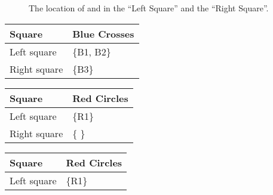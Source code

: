 \documentclass[a4paper,11pt,english]{sphinxmanual}
\begin{document}
\begin{figure}[htbp]
\centering
\capstart

\noindent{}
\caption{The location of  and  in the “Left Square” and the “Right Square”.}\label{\detokenize{background:id30}}\label{\detokenize{background:figuresquarepoint}}\end{figure}


\begin{savenotes}\sphinxattablestart
\centering
{}
\sphinxthecaptionisattop
{}\label{\detokenize{background:id31}}\label{\detokenize{background:tableiiia}}
\sphinxaftertopcaption
\begin{tabulary}{\linewidth}[t]{|T|T|}
\hline
\sphinxstyletheadfamily 
Square
&\sphinxstyletheadfamily 
Blue Crosses
\\
\hline
Left square
&
\{B1, B2\}
\\
\hline
Right square
&
\{B3\}
\\
\hline
\end{tabulary}
\par
\sphinxattableend\end{savenotes}


\begin{savenotes}\sphinxattablestart
\centering
{}
\sphinxthecaptionisattop
{}\label{\detokenize{background:id32}}\label{\detokenize{background:tableiiib}}
\sphinxaftertopcaption
\begin{tabulary}{\linewidth}[t]{|T|T|}
\hline
\sphinxstyletheadfamily 
Square
&\sphinxstyletheadfamily 
Red Circles
\\
\hline
Left square
&
\{R1\}
\\
\hline
Right square
&
\{  \}
\\
\hline
\end{tabulary}
\par
\sphinxattableend\end{savenotes}


\begin{savenotes}\sphinxattablestart
\centering
{}
\sphinxthecaptionisattop
{}\label{\detokenize{background:id33}}\label{\detokenize{background:tableiiic}}
\sphinxaftertopcaption
\begin{tabulary}{\linewidth}[t]{|T|T|}
\hline
\sphinxstyletheadfamily 
Square
&\sphinxstyletheadfamily 
Red Circles
\\
\hline
Left square
&
\{R1\}
\\
\hline
\end{tabulary}
\par
\sphinxattableend\end{savenotes}
\end{document}
